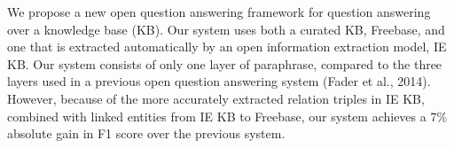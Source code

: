 We propose a new open question answering framework for question answering over a knowledge base (KB). Our system uses both a curated KB, Freebase, and one that is extracted automatically by an open information extraction model, IE KB. Our system consists of only one layer of paraphrase, compared to the three layers used in a previous open question answering system (Fader et al., 2014). However, because of the more accurately extracted relation triples in IE KB, combined with linked entities from IE KB to Freebase, our system achieves a 7\% absolute gain in F1 score over the previous system.
